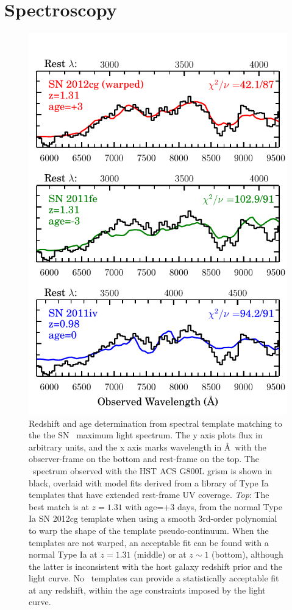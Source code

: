 \section{Spectroscopy}
\label{sec:Spectroscopy}

\begin{figure}
\begin{center}
\includegraphics[width=\columnwidth]{FIG/specfit}
\caption{  \label{fig:SpecFit}
Redshift and age determination from spectral template matching to the
the SN \tomas\ maximum light spectrum.  The y axis plots flux in
arbitrary units, and the x axis marks wavelength in \AA\ with the
observer-frame on the bottom and rest-frame on the top.
The \tomas\ spectrum observed with the
HST ACS G800L grism is shown in black, overlaid with model fits
derived from a library of Type Ia templates that have extended
rest-frame UV coverage.  {\it Top}: The best match is at $z=1.31$ with
age=$+3$ days, from the normal Type Ia SN 2012cg template when using a
smooth 3rd-order polynomial to warp the shape of the template
pseudo-continuum.  When the templates are not warped, an acceptable
fit can be found with a normal Type Ia at $z=1.31$ (middle) or at
$z\sim1$ (bottom), although the latter is inconsistent with the host
galaxy redshift prior and the light curve. No \CCSN\ templates can
provide a statistically acceptable fit at any redshift, within the age
constraints imposed by the light curve.}
\end{center}
\end{figure}


